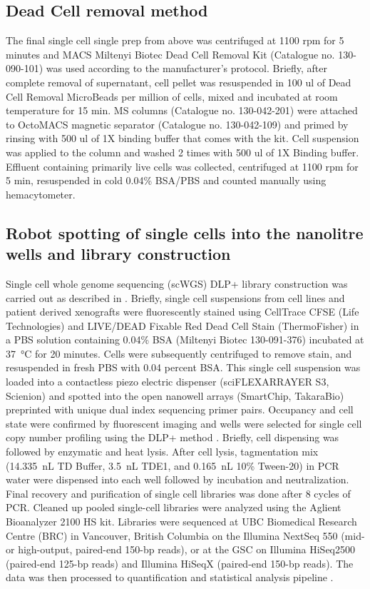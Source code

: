 \subsection{Dead Cell removal method}
The final single cell single prep from above was centrifuged at 1100 rpm for 5 minutes and MACS Miltenyi Biotec Dead Cell Removal Kit (Catalogue no. 130-090-101) was used according to the manufacturer's protocol. Briefly, after complete removal of supernatant, cell pellet was resuspended in 100 ul of
Dead Cell Removal MicroBeads per million of cells, mixed and incubated at room temperature for 15 min. MS columns (Catalogue no. 130-042-201) were attached to OctoMACS magnetic separator (Catalogue no. 130-042-109) and primed by rinsing with 500 ul of 1X binding buffer that comes with the kit. Cell suspension was
applied to the column and washed 2 times with 500 ul of 1X Binding buffer. Effluent containing primarily live cells was collected, centrifuged at 1100 rpm for 5 min, resuspended in cold 0.04\% BSA/PBS and counted manually using hemacytometer.


\subsection{Robot spotting of single cells into the nanolitre wells and library construction}
 Single cell whole genome sequencing (scWGS) DLP+ library construction was carried out as described in \cite{laks2019clonal}. Briefly, single cell suspensions from cell lines and patient derived xenografts were fluorescently stained using CellTrace CFSE (Life Technologies) and LIVE/DEAD Fixable Red Dead Cell Stain (ThermoFisher) in a PBS solution containing 0.04\% BSA (Miltenyi Biotec 130-091-376) incubated at \SI{37}{\degreeCelsius} for 20 minutes. Cells were subsequently centrifuged to remove stain, and resuspended in fresh PBS with 0.04 percent BSA. This single cell suspension was loaded into a contactless piezo electric dispenser (sciFLEXARRAYER S3, Scienion) and spotted into the open nanowell arrays (SmartChip, TakaraBio) preprinted with unique dual index sequencing primer pairs. Occupancy and cell state were confirmed by fluorescent imaging and wells were selected for single cell copy number profiling using the DLP+ method \cite{laks2019clonal}. Briefly, cell dispensing was followed by enzymatic and heat lysis. After cell lysis, tagmentation mix 
(\SI{14.335}{\nano\liter} TD Buffer, \SI{3.5}{\nano\liter} TDE1, and \SI{0.165}{\nano\liter} 10\% Tween-20) in PCR water were dispensed into each well followed by incubation and neutralization. Final recovery and purification of single cell libraries was done after 8 cycles of PCR. Cleaned up pooled single-cell libraries were analyzed using the Aglient Bioanalyzer 2100 HS kit. Libraries were sequenced at UBC Biomedical Research Centre (BRC) in Vancouver, British Columbia on the Illumina NextSeq 550 (mid- or high-output, paired-end 150-bp reads), or at the GSC on Illumina HiSeq2500 (paired-end 125-bp reads) and Illumina HiSeqX (paired-end 150-bp reads). The data was then processed to quantification and statistical analysis pipeline \cite{laks2019clonal}.


